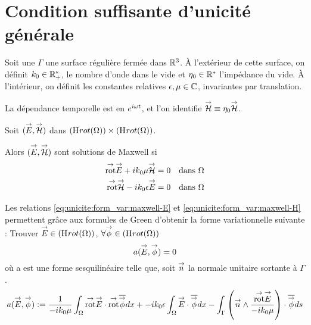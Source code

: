\section{Condition suffisante d'unicité générale}

  Soit une \(\Gamma\) une surface régulière fermée dans \(\mathbb R^3\).
  À l'extérieur de cette surface, on définit \(k_0 \in \mathbb R_+^*\), le nombre d'onde dans le vide et \(\eta_0 \in \mathbb R^*\) l'impédance du vide.
  À l'intérieur, on définit les constantes relatives \(\epsilon,\mu \in \mathbb C\), invariantes par translation.

  \begin{tcolorbox}
    \centering
    La dépendance temporelle est en \(e^{i\omega t}\), et l'on identifie \({\overset{\rightarrow}{\mathcal{H}}} \equiv \eta _0 {\overset{\rightarrow}{\mathcal{H}}}\).
  \end{tcolorbox}

  Soit \(({\overset{\rightarrow}{E}},{\overset{\rightarrow}{\mathcal{H}}})\) dans \((\mathrm{H}_\mathrm{{}}{rot}(\Omega)) \times (\mathrm{H}_\mathrm{{}}{rot}(\Omega))\).

  Alors \(({\overset{\rightarrow}{E}},{\overset{\rightarrow}{\mathcal{H}}})\) sont solutions de Maxwell si
  \begin{align}
    \label{eq:unicite:form_var:maxwell-E}
    \trot \vE + ik_0 \mu \vH &= 0 && \text{dans \(\OO\)}
    \\\label{eq:unicite:form_var:maxwell-H}
    \trot \vH - ik_0\eps \vE &= 0 && \text{dans \(\OO\)}
  \end{align}

  Les relations \eqref{eq:unicite:form_var:maxwell-E} et \eqref{eq:unicite:form_var:maxwell-H} permettent grâce aux formules de Green d'obtenir la forme variationnelle suivante :
  Trouver \({\overset{\rightarrow}{E}} \in \left(\mathrm{H}_\mathrm{{}}{rot}(\Omega)\right)\), \(\forall {\overset{\rightarrow}{\phi}} \in \left(\mathrm{H}_\mathrm{{}}{rot}(\Omega)\right)\)
  \[
    a({\overset{\rightarrow}{E}},{\overset{\rightarrow}{\phi}}) = 0
  \]
  où a est une forme sesquilinéaire telle que, soit \({\overset{\rightarrow}{n}}\) la normale unitaire sortante à \(\Gamma\).
  \begin{align*}
    a({\overset{\rightarrow}{E}},{\overset{\rightarrow}{\phi}}) &:=  \dfrac{1}{-ik_0\mu} \int_\Omega {{\overset{\rightarrow}{\operatorname{rot}}}} {\overset{\rightarrow}{E}} \cdot {{\overset{\rightarrow}{\operatorname{rot}}}} {\overline{{\overset{\rightarrow}{\phi}}}} dx + -ik_0\epsilon\int_\Omega{\overset{\rightarrow}{E}}\cdot{\overline{{\overset{\rightarrow}{\phi}}}} dx
     - \int_\Gamma \left({\overset{\rightarrow}{n}} \wedge \dfrac{{{\overset{\rightarrow}{\operatorname{rot}}}} {\overset{\rightarrow}{E}}}{-ik_0\mu}\right) \cdot {\overline{{\overset{\rightarrow}{\phi}}}} ds \\
   \end{align*}

